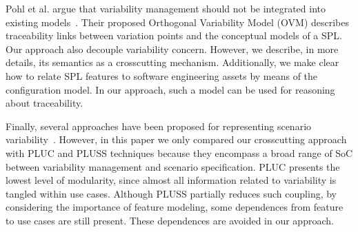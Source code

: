\documentclass{report}
\begin{document}
\begin{frontmatter}
{Pohl et al. argue that variability management should not be
integrated into existing models~\cite{phol-spl-book}. Their proposed
Orthogonal Variability Model (OVM) describes traceability links
between variation points and the conceptual models of a SPL. Our
approach also decouple variability concern. However, we describe, in more
details, its semantics as a crosscutting mechanism. Additionally, we make
clear how to relate SPL features to software engineering assets by means of the
configuration model. In our approach, such a model can be used for reasoning 
about traceability.


Finally, several approaches have been proposed for representing 
scenario variability~\cite{jacobson-reuse-book, favaro-icsr-98, eriksson-splc-2005,bertolino-esec-2003}. 
However, in this paper we only compared our crosscutting approach with PLUC and 
PLUSS techniques because they encompass a broad range of SoC between 
variability management and scenario specification. PLUC presents the lowest level of 
modularity, since almost all information related to variability is tangled within use 
cases. Although PLUSS partially reduces such coupling, by considering the 
importance of feature modeling, some dependences from feature to use cases are
still present. These dependences are avoided in our approach.


%

}
\end{frontmatter}
\end{document}
